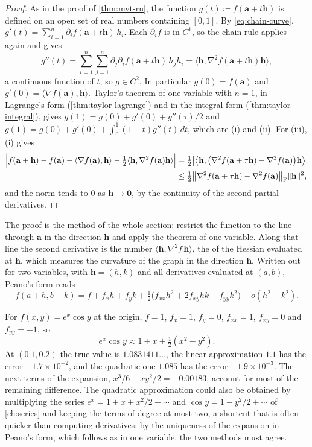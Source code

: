 \begin{proof}
As in the proof of \cref{thm:mvt-rn}, the function $g(t)\coloneqq f(\mathbf a+t\mathbf h)$ is defined on an open set of real numbers containing $[0,1]$. By \eqref{eq:chain-curve}, $g'(t)=\sum_{i=1}^n\partial_if(\mathbf a+t\mathbf h)\,h_i$. Each $\partial_if$ is in $C^1$, so the chain rule applies again and gives
\[
g''(t)=\sum_{i=1}^n\sum_{j=1}^n\partial_j\partial_if(\mathbf a+t\mathbf h)\,h_jh_i=\bigl\langle\mathbf h,\nabla^2f(\mathbf a+t\mathbf h)\mathbf h\bigr\rangle ,
\]
a continuous function of $t$; so $g\in C^2$. In particular $g(0)=f(\mathbf a)$ and $g'(0)=\langle\nabla f(\mathbf a),\mathbf h\rangle$. Taylor's theorem of one variable with $n=1$, in Lagrange's form (\cref{thm:taylor-lagrange}) and in the integral form (\cref{thm:taylor-integral}), gives $g(1)=g(0)+g'(0)+g''(\tau)/2$ and $g(1)=g(0)+g'(0)+\int_0^1(1-t)g''(t)\,dt$, which are (i) and (ii). For (iii), (i) gives
\[
\begin{aligned}
\Bigl|f(\mathbf a+\mathbf h)-f(\mathbf a)-\langle\nabla f(\mathbf a),\mathbf h\rangle-\tfrac12\langle\mathbf h,\nabla^2f(\mathbf a)\mathbf h\rangle\Bigr|&=\tfrac12\bigl|\bigl\langle\mathbf h,\bigl(\nabla^2f(\mathbf a+\tau\mathbf h)-\nabla^2f(\mathbf a)\bigr)\mathbf h\bigr\rangle\bigr|\\
&\le\tfrac12\bigl\|\nabla^2f(\mathbf a+\tau\mathbf h)-\nabla^2f(\mathbf a)\bigr\|_{\mathrm F}\|\mathbf h\|^2 ,
\end{aligned}
\]
and the norm tends to $0$ as $\mathbf h\to\mathbf0$, by the continuity of the second partial derivatives.
\end{proof}

The proof is the method of the whole section: restrict the function to the line through $\mathbf a$ in the direction $\mathbf h$ and apply the theorem of one variable. Along that line the second derivative is the number $\langle\mathbf h,\nabla^2f\,\mathbf h\rangle$, the  of the Hessian evaluated at $\mathbf h$, which measures the curvature of the graph in the direction $\mathbf h$. Written out for two variables, with $\mathbf h=(h,k)$ and all derivatives evaluated at $(a,b)$, Peano's form reads
\[
f(a+h,b+k)=f+f_xh+f_yk+\tfrac12\bigl(f_{xx}h^2+2f_{xy}hk+f_{yy}k^2\bigr)+o(h^2+k^2).
\]

For $f(x,y)=e^x\cos y$ at the origin, $f=1$, $f_x=1$, $f_y=0$, $f_{xx}=1$, $f_{xy}=0$ and $f_{yy}=-1$, so
\[
e^x\cos y\approx1+x+\tfrac12(x^2-y^2).
\]
At $(0.1,0.2)$ the true value is $1.0831411\ldots$, the linear approximation $1.1$ has the error $-1.7\times10^{-2}$, and the quadratic one $1.085$ has the error $-1.9\times10^{-3}$. The next terms of the expansion, $x^3/6-xy^2/2=-0.00183$, account for most of the remaining difference. The quadratic approximation could also be obtained by multiplying the series $e^x=1+x+x^2/2+\cdots$ and $\cos y=1-y^2/2+\cdots$ of \cref{ch:series} and keeping the terms of degree at most two, a shortcut that is often quicker than computing derivatives; by the uniqueness of the expansion in Peano's form, which follows as in one variable, the two methods must agree.

